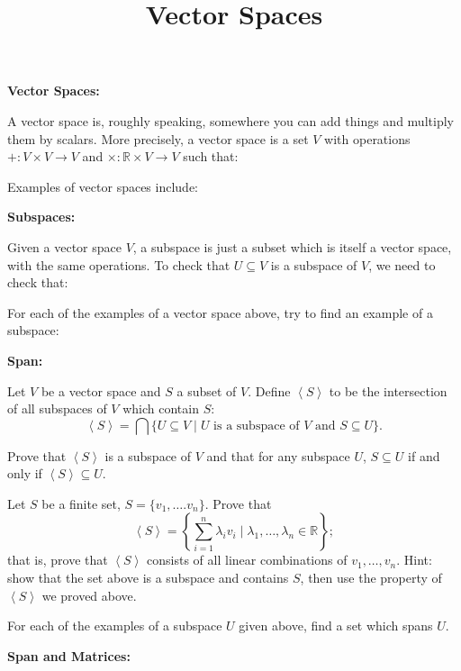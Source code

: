 \documentclass{article}
\newcommand{\SP}[1]{\left\langle #1 \right\rangle}
\begin{document}
\title{Vector Spaces}
\date{}

\maketitle
\thispagestyle{empty}

\Large

\textbf{Vector Spaces:}\bigskip

A vector space is, roughly speaking, somewhere you can add things and multiply them by scalars. More precisely, a vector space is a set $V$ with operations $+:V\times V\to V$ and $\times :\mathbb{R}\times V\to V$ such that:
\vfill

Examples of vector spaces include:

\vfill

\clearpage


\textbf{Subspaces:}\bigskip

Given a vector space $V$, a subspace is just a subset which is itself a vector space, with the same operations. To check that $U\subseteq V$ is a subspace of $V$, we need to check that:
\vfill


For each of the examples of a vector space above, try to find an example of a subspace:
\vfill


\clearpage

\textbf{Span:}\bigskip


Let $V$ be a vector space and $S$ a subset of $V$. Define $\SP{S}$ to be the intersection of all subspaces of $V$ which contain $S$:
\[\SP{S}=\bigcap\{U\subseteq V\mid \mbox{$U$ is a subspace of $V$ and }S\subseteq U\}.\]

Prove that $\SP{S}$ is a subspace of $V$ and that for any subspace $U$, $S\subseteq U$ if and only if $\SP{S}\subseteq U$.
\vfill

Let $S$ be a finite set, $S=\{v_1,\hdots.v_n\}$. Prove that
\[\SP{S}=\left\{\sum_{i=1}^n \lambda_iv_i \mid \lambda_1,\hdots,\lambda_n\in\mathbb{R}\right\};\]
that is, prove that $\SP{S}$ consists of all linear combinations of $v_1,\hdots,v_n$. Hint: show that the set above is a subspace and contains $S$, then use the property of $\SP{S}$ we proved above.

\vfill

For each of the examples of a subspace $U$ given above, find a set which spans $U$.

\clearpage

\textbf{Span and Matrices:}\bigskip
\end{document}

